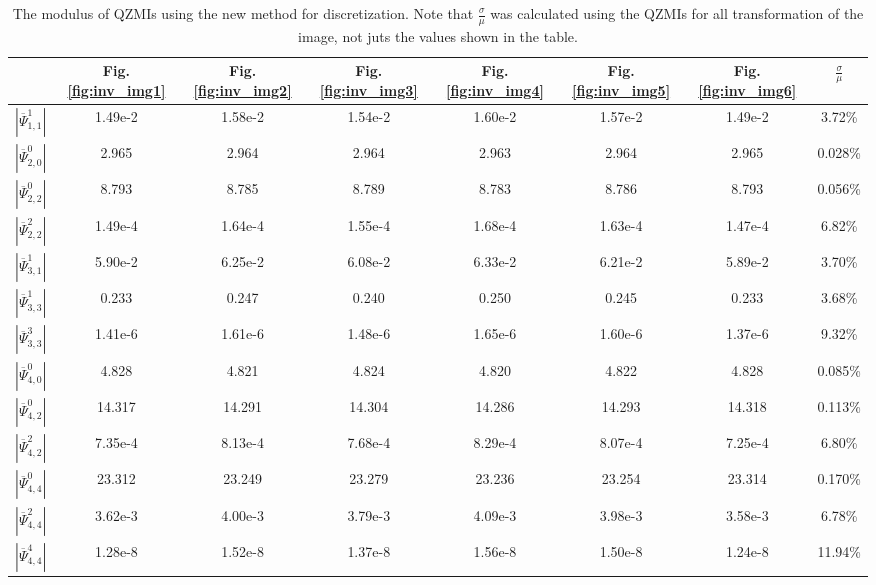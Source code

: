 \begin{table}
	\centering
\begin{tabular}{| c || c | c | c | c | c | c || c | } \hline
& Fig.\ref{fig:inv_img1} & Fig.\ref{fig:inv_img2} & Fig.\ref{fig:inv_img3} & Fig.\ref{fig:inv_img4} & Fig.\ref{fig:inv_img5} & Fig.\ref{fig:inv_img6} & $\frac{\sigma}{\mu}$ \\ \hline\hline
$|\overline{\Psi}_{1,1}^1|$ & 1.49e-2 & 1.58e-2 & 1.54e-2 & 1.60e-2 & 1.57e-2 & 1.49e-2 & 3.72\% \\ \hline
$|\overline{\Psi}_{2,0}^0|$ & 2.965 & 2.964 & 2.964 & 2.963 & 2.964 & 2.965 & 0.028\%\\ \hline
$|\overline{\Psi}_{2,2}^0|$ & 8.793 & 8.785 & 8.789 & 8.783 & 8.786 & 8.793 & 0.056\%\\ \hline
$|\overline{\Psi}_{2,2}^2|$ & 1.49e-4 & 1.64e-4 & 1.55e-4 & 1.68e-4 & 1.63e-4 & 1.47e-4 & 6.82\%\\ \hline
$|\overline{\Psi}_{3,1}^1|$ & 5.90e-2 & 6.25e-2 & 6.08e-2 & 6.33e-2 & 6.21e-2 & 5.89e-2 & 3.70\%\\ \hline
$|\overline{\Psi}_{3,3}^1|$ & 0.233 & 0.247 & 0.240 & 0.250 & 0.245 & 0.233 & 3.68\%\\ \hline
$|\overline{\Psi}_{3,3}^3|$ & 1.41e-6 & 1.61e-6 & 1.48e-6 & 1.65e-6 & 1.60e-6 & 1.37e-6 & 9.32\%\\ \hline
$|\overline{\Psi}_{4,0}^0|$ & 4.828 & 4.821 & 4.824 & 4.820 & 4.822 & 4.828 & 0.085\%\\ \hline
$|\overline{\Psi}_{4,2}^0|$ & 14.317 & 14.291 & 14.304 & 14.286 & 14.293 & 14.318 & 0.113\%\\ \hline
$|\overline{\Psi}_{4,2}^2|$ & 7.35e-4 & 8.13e-4 & 7.68e-4 & 8.29e-4 & 8.07e-4 & 7.25e-4 & 6.80\%\\ \hline
$|\overline{\Psi}_{4,4}^0|$ & 23.312 & 23.249 & 23.279 & 23.236 & 23.254 & 23.314 & 0.170\%\\ \hline
$|\overline{\Psi}_{4,4}^2|$ & 3.62e-3 & 4.00e-3 & 3.79e-3 & 4.09e-3 & 3.98e-3 & 3.58e-3 & 6.78\%\\ \hline
$|\overline{\Psi}_{4,4}^4|$ & 1.28e-8 & 1.52e-8 & 1.37e-8 & 1.56e-8 & 1.50e-8 & 1.24e-8 & 11.94\%\\ \hline
\end{tabular}
\caption{The modulus of QZMIs using the new method for discretization. Note that $\frac{\sigma}{\mu}$ was calculated using the QZMIs for all transformation of the image, not juts the values shown in the table.}
\label{tab:inv_new}
\end{table}

